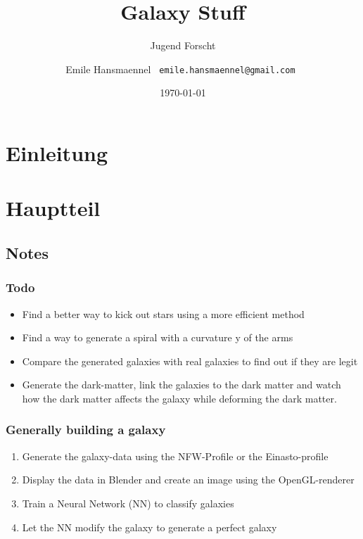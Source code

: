 \documentclass[a4paper,12pt]{scrartcl}
\begin{document}
\title{Galaxy Stuff}
\subtitle{Jugend Forscht \the\year}
\author{ Emile Hansmaennel \texttt{ emile.hansmaennel@gmail.com }}
\date{\today}

\maketitle



\thispagestyle{empty}
\clearpage
\newpage
\setcounter{page}{1}

\tableofcontents
\newpage

\section{Einleitung} \label{Einleitung}

\newpage

\section{Hauptteil} \label{Hauptteil}
\subsection{Notes}

\subsubsection{Todo}

\begin{itemize}
  \item Find a better way to kick out stars using a more efficient method
  \item Find a way to generate a spiral with a curvature y of the arms
  \item Compare the generated galaxies with real galaxies to find out if they
  are legit
  \item Generate the dark-matter, link the galaxies to the dark matter and watch
  how the dark matter affects the galaxy while deforming the dark matter. 
\end{itemize}

\subsubsection{Generally building a galaxy}

\begin{enumerate}
  \item Generate the galaxy-data using the NFW-Profile or the Einasto-profile
  \item Display the data in Blender and create an image using the OpenGL-renderer
  \item Train a Neural Network (NN) to classify galaxies
  \item Let the NN modify the galaxy to generate a perfect galaxy
\end{enumerate}
\end{document}
